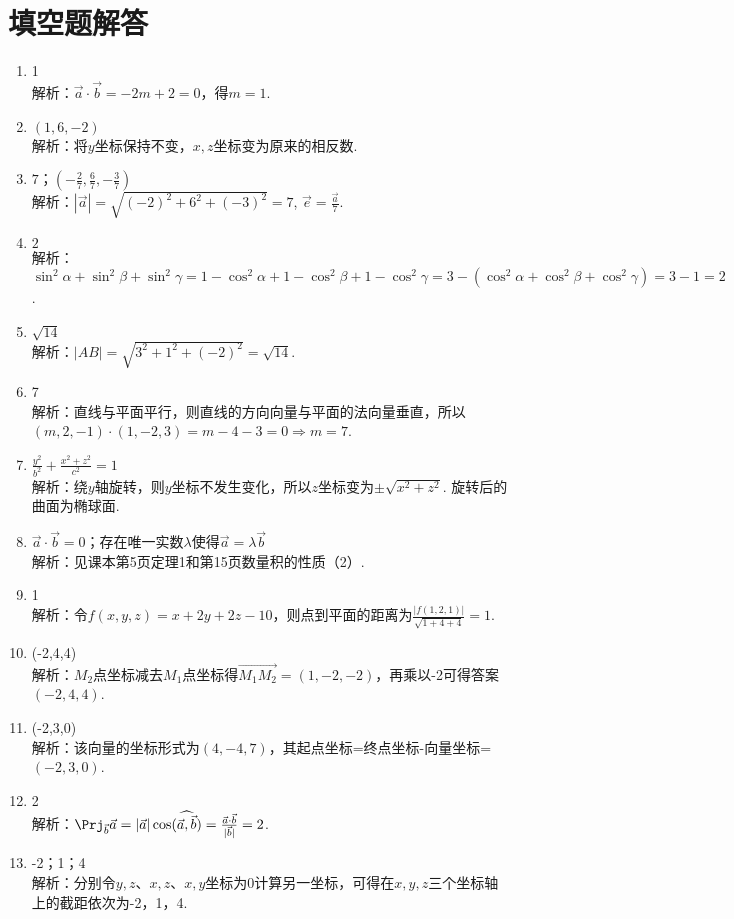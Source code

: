 \section{填空题解答}
\begin{enumerate}
	\item 1\\
		解析：$ \vec{a}\cdot\vec{b} = -2m+2 = 0 $，得$ m=1 $.
	\item $(1,6,-2)$\\
		解析：将$ y $坐标保持不变，$ x,z $坐标变为原来的相反数.
	\item $7$；$ (-\frac{2}{7},\frac{6}{7},-\frac{3}{7}) $\\
		解析：$ |\vec{a}|=\sqrt{(-2)^2+6^2+(-3)^2}=7 $, $ \vec{e}=\frac{\vec{a}}{7} $.
	\item $2$\\
		解析：$ \sin^2 \alpha + \sin^2 \beta + \sin^2 \gamma = 1-\cos^2 \alpha + 1-\cos^2 \beta + 1-\cos^2 \gamma = 3 - (\cos^2 \alpha + \cos^2 \beta + \cos^2 \gamma) = 3-1 = 2$.
	\item $ \sqrt{14} $\\
		解析：$ |AB|=\sqrt{3^2+1^2+(-2)^2}=\sqrt{14} $.
	\item 7\\
		解析：直线与平面平行，则直线的方向向量与平面的法向量垂直，所以$ (m,2,-1)\cdot(1,-2,3)=m-4-3=0\Rightarrow m = 7 $.
	\item $ \frac{y^2}{b^2}+\frac{x^2+z^2}{c^2}=1 $\\
		解析：绕$ y $轴旋转，则$ y $坐标不发生变化，所以$ z $坐标变为$ \pm\sqrt{x^2+z^2} $. 旋转后的曲面为椭球面.
	\item $ \vec{a}\cdot\vec{b}=0 $；存在唯一实数$ \lambda $使得$ \vec{a}=\lambda\vec{b} $\\
		解析：见课本第5页定理1和第15页数量积的性质（2）.
	\item 1\\
		解析：令$ f(x,y,z)=x+2y+2z-10 $，则点到平面的距离为$ \frac{|f(1,2,1)|}{\sqrt{1+4+4}}=1 $.
	\item (-2,4,4)\\
		解析：$ M_2 $点坐标减去$ M_1 $点坐标得$ \overrightarrow{M_1M_2}=(1,-2,-2) $，再乘以-2可得答案$ (-2,4,4) $.
	\item (-2,3,0)\\
		解析：该向量的坐标形式为$ (4,-4,7) $，其起点坐标=终点坐标-向量坐标=$ (-2,3,0) $.
	\item 2\\
		解析：$ \Prj_{\vec{b}}\vec{a} = |\vec{a}|\cos(\widehat{\vec{a},\vec{b}}) = \frac{\vec{a}\cdot\vec{b}}{|\vec{b}|} = 2 $.
	\item -2；1；4\\
		解析：分别令$ y,z $、$ x,z $、$ x,y $坐标为0计算另一坐标，可得在$ x,y,z $三个坐标轴上的截距依次为-2，1，4.
\end{enumerate}
